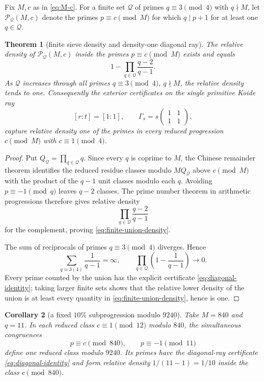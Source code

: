 \documentclass[11pt]{article}
\newtheorem{theorem}{Theorem}[section]
\newtheorem{corollary}[theorem]{Corollary}
\theoremstyle{definition}
\theoremstyle{remark}
\newcommand{\1}{\mathbf 1}
\newcommand{\mat}[4]{\begin{pmatrix}#1&#2\\#3&#4\end{pmatrix}}
\begin{document}
Fix $M,c$ as in \eqref{eq:M-c}.  For a finite set $\mathcal Q$ of primes
$q\equiv3\pmod4$ with $q\nmid M$, let $\mathscr P_{\mathcal Q}(M,c)$ denote
the primes $p\equiv c\pmod M$ for which $q\mid p+1$ for at least one
$q\in\mathcal Q$.

\begin{theorem}[finite sieve density and density-one diagonal ray]
\label{thm:density-one-ray}
The relative density of $\mathscr P_{\mathcal Q}(M,c)$ inside the primes
$p\equiv c\pmod M$ exists and equals
\begin{equation}\label{eq:finite-union-density}
 \boxed{
 1-\prod_{q\in\mathcal Q}\frac{q-2}{q-1}.}
\end{equation}
As $\mathcal Q$ increases through all primes $q\equiv3\pmod4$, $q\nmid M$,
the relative density tends to one.  Consequently the exterior certificates
on the single primitive Koide ray
\begin{equation}\label{eq:diagonal-ray}
 [r:t]=[1:1],
 \qquad
 \Gamma_s=s\mat{1}{1}{1}{1},
\end{equation}
capture relative density one of the primes in every reduced progression
$c\pmod M$ with $c\equiv1\pmod4$.
\end{theorem}

\begin{proof}
Put $Q_{\mathcal Q}=\prod_{q\in\mathcal Q}q$.  Since every $q$ is coprime to
$M$, the Chinese remainder theorem identifies the reduced residue classes
modulo $MQ_{\mathcal Q}$ above $c\pmod M$ with the product of the
$q-1$ unit classes modulo each $q$.  Avoiding $p\equiv-1\pmod q$ leaves
$q-2$ classes.  The prime number theorem in arithmetic progressions therefore
gives relative density
\[
 \prod_{q\in\mathcal Q}\frac{q-2}{q-1}
\]
for the complement, proving \eqref{eq:finite-union-density}.

The sum of reciprocals of primes $q\equiv3\pmod4$ diverges.  Hence
\[
 \sum_{q\equiv3(4)}\frac1{q-1}=\infty,
 \qquad
 \prod_{q\in\mathcal Q}
 \left(1-\frac1{q-1}\right)\longrightarrow0.
\]
Every prime counted by the union has the explicit certificate
\eqref{eq:diagonal-identity}; taking larger finite sets shows that the
relative lower density of the union is at least every quantity in
\eqref{eq:finite-union-density}, hence is one.
\end{proof}

\begin{corollary}[a fixed $10\%$ subprogression modulo $9240$]
Take $M=840$ and $q=11$.  In each reduced class $c\equiv1\pmod{12}$ modulo
$840$, the simultaneous congruences
\begin{equation}\label{eq:q11-CRT}
 p\equiv c\pmod{840},
 \qquad p\equiv-1\pmod{11}
\end{equation}
define one reduced class modulo $9240$.  Its primes have the diagonal-ray
certificate \eqref{eq:diagonal-identity} and form relative density
$1/(11-1)=1/10$ inside the class $c\pmod{840}$.
\end{corollary}
\end{document}
